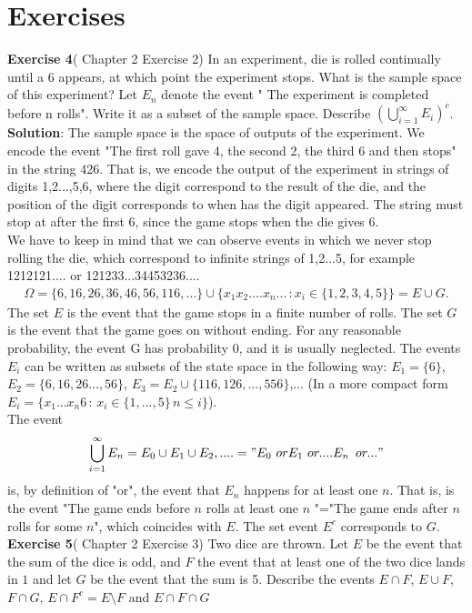 \documentclass[reqno]{amsart}
\newcommand{\<}{{\langle \!\! \langle}}
\renewcommand{\>}{{\rangle \!\! \rangle}}
\newcommand{\bel}[2]{\begin{equation} \label{#1} \begin{split} #2
 					\end{split} \end{equation}}
\begin{document}
\section{Exercises}

\textbf{Exercise 4}(\cite{Ross} Chapter 2 Exercise 2)
 In an experiment, die is rolled continually until a 6 appears, at which point the experiment stops. What is the sample space of this experiment? Let $E_n$ denote the event " The experiment is completed before n rolls". Write it as a subset of the sample space. Describe $\left(\bigcup_{i=1}^\infty E_i\right)^c$.
\\
\textbf{Solution}: The sample space is the space of outputs of the experiment. We encode the event "The first roll gave 4, the second 2, the third 6 and then stops" in the string 426. That is, we encode the output of the experiment in strings of digits 1,2...,5,6,  where the digit correspond to the result of the die, and the position of the digit corresponds to when has the digit appeared. The string must stop at after the first 6, since the game stops when the die gives 6. \\We have to keep in mind that we can observe events in which we never stop rolling the die, which correspond to infinite strings of 1,2...5, for example 1212121.... or  121233...34453236.... 
\bel{}{\Omega=\{ 6, 16, 26, 36, 46, 56,116,...\}\cup\{x_1x_2....x_n...\,: x_{i}\in\{1,2,3,4,5\} \}=E\cup G.}
The set $E$ is the event that the game stops in a finite number of rolls. The set $G$ is the event that the game goes on without ending. For any reasonable probability, the event G has probability 0, and it is usually neglected. 
The events $E_i$ can be written as subsets of the state space in the following way: $E_1=\{6\}$, $E_2=\{6,16,26...,56\}$, $E_3=E_2 \cup \{116,126,...,556\}$,... (In a more compact form $E_i=\{x_1...x_n6\,:\, x_i\in\{1,...,5\}\, n\leq i\}$).\\
The event $$\bigcup_{i=1}^\infty E_n= E_0\cup E_1\cup E_2,....= "E_0\,\, or E_1 \,\,or ....E_n \,\,\,or ..."$$
is, by definition of "or", the event that $E_n$ happens for at least one $n$. That is, is the event "The game ends before $n$ rolls at least one $n$ "="The game ends after $n$ rolls for some $n$", which coincides with $E$.
The set event $E^c$ corresponds to $G$. 
\textbf{Exercise 5}(\cite{Ross} Chapter 2 Exercise 3)
Two dice are thrown. Let $E$ be the event that the sum of the dice is odd, and $F$ the event that at least one of the two dice lands in $1$ and let $G$ be the event that the sum is 5. Describe the events $E\cap F $, $E\cup F$, $F\cap G$, $E\cap F^c=E\setminus F$ and $E \cap F\cap G$
\end{document}

